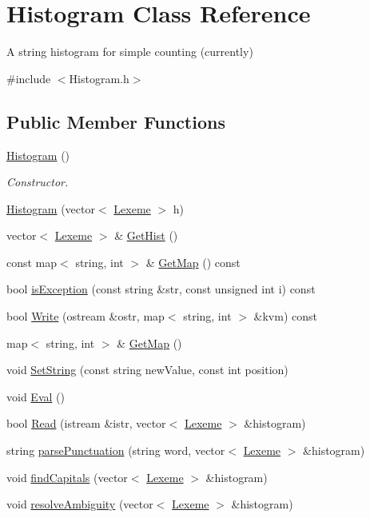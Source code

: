 \hypertarget{class_histogram}{}\section{Histogram Class Reference}
\label{class_histogram}


A string histogram for simple counting (currently)  




{\ttfamily \#include $<$Histogram.\+h$>$}

\subsection*{Public Member Functions}
\begin{DoxyCompactItemize}
\item 
\hyperlink{class_histogram_af681f293852ac145f867ecfcce3062a5}{Histogram} ()
\begin{DoxyCompactList}\small\item\em Constructor. \end{DoxyCompactList}\item 
\hyperlink{class_histogram_a5e56d61b85862889a024c1a682981964}{Histogram} (vector$<$ \hyperlink{class_lexeme}{Lexeme} $>$ h)
\item 
vector$<$ \hyperlink{class_lexeme}{Lexeme} $>$ \& \hyperlink{class_histogram_afe807b7c5109c6a9781216961f2a9e90}{Get\+Hist} ()
\item 
const map$<$ string, int $>$ \& \hyperlink{class_histogram_a605a2f87dcbe0c52e956ed6e559daf81}{Get\+Map} () const
\item 
bool \hyperlink{class_histogram_aff24f16064c037ca8929c4f9751aedbf}{is\+Exception} (const string \&str, const unsigned int i) const
\item 
bool \hyperlink{class_histogram_af8b644d9dcb8dd86fb3420640de72ab2}{Write} (ostream \&ostr, map$<$ string, int $>$ \&kvm) const
\item 
map$<$ string, int $>$ \& \hyperlink{class_histogram_a7a4b270eb5d88df6466cef9433a95d39}{Get\+Map} ()
\item 
void \hyperlink{class_histogram_a3b48f22da2e0c9f1d12ecd7a83f0dcf6}{Set\+String} (const string new\+Value, const int position)
\item 
void \hyperlink{class_histogram_af4fdfc3e8e4c4028deaf9b663ee5832c}{Eval} ()
\item 
bool \hyperlink{class_histogram_afbdf1d9a97070fd3724dbe55fd9f8570}{Read} (istream \&istr, vector$<$ \hyperlink{class_lexeme}{Lexeme} $>$ \&histogram)
\item 
string \hyperlink{class_histogram_aa1ae3a4f490aef85530afc028867b8f4}{parse\+Punctuation} (string word, vector$<$ \hyperlink{class_lexeme}{Lexeme} $>$ \&histogram)
\item 
void \hyperlink{class_histogram_a97384bc67a4fcbd79f405329de0a4b41}{find\+Capitals} (vector$<$ \hyperlink{class_lexeme}{Lexeme} $>$ \&histogram)
\item 
void \hyperlink{class_histogram_a5adb0e9b69168b662af9f84cbf29d5a0}{resolve\+Ambiguity} (vector$<$ \hyperlink{class_lexeme}{Lexeme} $>$ \&histogram)
\end{DoxyCompactItemize}


